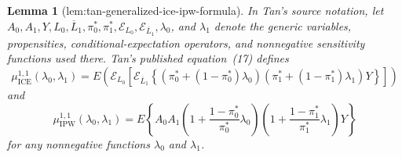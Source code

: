 \documentclass{article}
\newtheorem{lemma}{Lemma}
\begin{document}
\begin{lemma}[lem:tan-generalized-ice-ipw-formula]\label{lem:tan-generalized-ice-ipw-formula}
In Tan's source notation, let \(A_0,A_1,Y,L_0,\overline L_1,\pi_0^*,\pi_1^*,\mathcal E_{L_0},\mathcal E_{\overline L_1},\lambda_0\), and \(\lambda_1\) denote the generic variables, propensities, conditional-expectation operators, and nonnegative sensitivity functions used there. Tan's published equation~(17) defines
\[
\mu^{1,1}_{\mathrm{ICE}}(\lambda_0,\lambda_1)
=E\!\left(\mathcal E_{L_0}\!\left[\mathcal E_{\overline L_1}\!\left\{(\pi_0^*+(1-\pi_0^*)\lambda_0)(\pi_1^*+(1-\pi_1^*)\lambda_1)Y\right\}\right]\right)
\]
and
\[
\mu^{1,1}_{\mathrm{IPW}}(\lambda_0,\lambda_1)
=E\!\left\{A_0A_1\left(1+\frac{1-\pi_0^*}{\pi_0^*}\lambda_0\right)\left(1+\frac{1-\pi_1^*}{\pi_1^*}\lambda_1\right)Y\right\}
\]
for any nonnegative functions \(\lambda_0\) and \(\lambda_1\).
\end{lemma}
\end{document}
